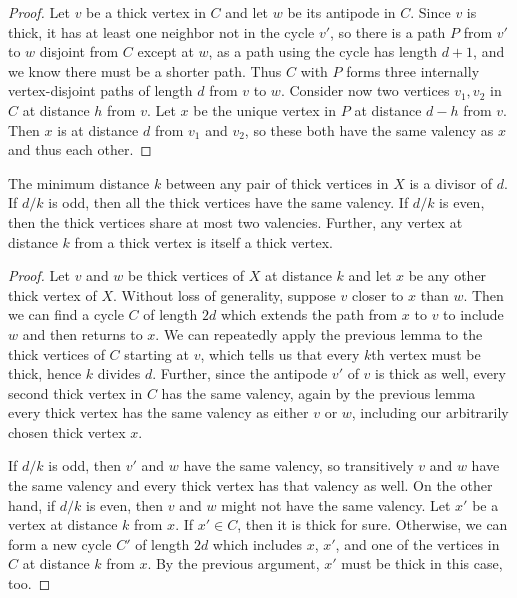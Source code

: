 \begin{proof}
	Let $v$ be a thick vertex in $C$ and let $w$ be its antipode in $C$.  Since $v$ is thick, it has at least one neighbor not in the cycle $v'$, so there is a path $P$ from $v'$ to $w$ disjoint from $C$ except at $w$, as a path using the cycle has length $d+1$, and we know there must be a shorter path.  Thus $C$ with $P$ forms three internally vertex-disjoint paths of length $d$ from $v$ to $w$.  Consider now two vertices $v_1,v_2$ in $C$ at distance $h$ from $v$.   Let $x$ be the unique vertex in $P$ at distance $d-h$ from $v$.  Then $x$ is at distance $d$ from $v_1$ and $v_2$, so these both have the same valency as $x$ and thus each other.
\end{proof}
\begin{lemma}
	The minimum distance $k$ between any pair of thick vertices in $X$ is a divisor of $d$.  If $d/k$ is odd, then all the thick vertices have the same valency.  If $d/k$ is even, then the thick vertices share at most two valencies.  Further, any vertex at distance $k$ from a thick vertex is itself a thick vertex.
\end{lemma}
\begin{proof}
	Let $v$ and $w$ be thick vertices of $X$ at distance $k$ and let $x$ be any other thick vertex of $X$.  Without loss of generality, suppose $v$ closer to $x$ than $w$.  Then we can find a cycle $C$ of length $2d$ which extends the path from $x$ to $v$ to include $w$ and then returns to $x$.  We can repeatedly apply the previous lemma to the thick vertices of $C$ starting at $v$, which tells us that every $k$th vertex must be thick, hence $k$ divides $d$.  Further, since the antipode $v'$ of $v$ is thick as well, every second thick vertex in $C$ has the same valency, again by the previous lemma every thick vertex has the same valency as either $v$ or $w$, including our arbitrarily chosen thick vertex $x$.
	
	If $d/k$ is odd, then $v'$ and $w$ have the same valency, so transitively $v$ and $w$ have the same valency and every thick vertex has that valency as well.  On the other hand, if $d/k$ is even, then $v$ and $w$ might not have the same valency.  Let $x'$ be a vertex at distance $k$ from $x$. If $x'\in C$, then it is thick for sure.  Otherwise, we can form a new cycle $C'$ of length $2d$ which includes $x$, $x'$, and one of the vertices in $C$ at distance $k$ from $x$.  By the previous argument, $x'$ must be thick in this case, too.
\end{proof}


